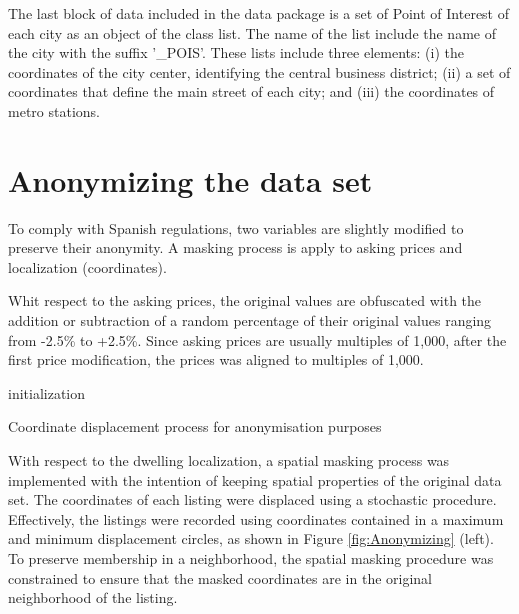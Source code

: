 \documentclass[Royal,times,sageh]{sagej}
\begin{document}
The last block of data included in the data package is a set of Point of
Interest of each city as an object of the class list. The name of the
list include the name of the city with the suffix '\_POIS'. These lists
include three elements: (i) the coordinates of the city center,
identifying the central business district; (ii) a set of coordinates
that define the main street of each city; and (iii) the coordinates of
metro stations.

\hypertarget{anonymizing}{%
\section{Anonymizing the data set}\label{anonymizing}}

To comply with Spanish regulations, two variables are slightly modified
to preserve their anonymity. A masking process is apply to asking prices
and localization (coordinates).

Whit respect to the asking prices, the original values are obfuscated
with the addition or subtraction of a random percentage of their
original values ranging from -2.5\% to +2.5\%. Since asking prices are
usually multiples of 1,000, after the first price modification, the
prices was aligned to multiples of 1,000.

\begin{algorithm}[!ht]
 initialization\;
 \caption{Coordinate displacement process for anonymisation purposes}
 \label{algo:coordinates-displacement}
\end{algorithm}

With respect to the dwelling localization, a spatial masking process was
implemented with the intention of keeping spatial properties of the
original data set. The coordinates of each listing were displaced using
a stochastic procedure. Effectively, the listings were recorded using
coordinates contained in a maximum and minimum displacement circles, as
shown in Figure \ref{fig:Anonymizing} (left). To preserve membership in
a neighborhood, the spatial masking procedure was constrained to ensure
that the masked coordinates are in the original neighborhood of the
listing.
\end{document}
